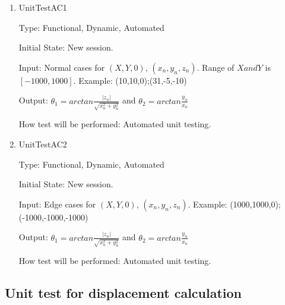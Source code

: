 \documentclass[12pt, titlepage]{article}
\begin{document}
\begin{enumerate}
	
	\item{UnitTestAC1\\}
	
	Type: Functional, Dynamic, Automated
	
	Initial State: New session.
	
	Input: Normal cases for $(X,Y,0)$, $(x_{n},y_{n},z_{n})$. Range of $X and Y$ is $[-1000,1000]$. Example: (10,10,0);(31,-5,-10)
	
	Output: $\theta_{1}=arctan \frac{|z_{n}|}{\sqrt{x_{n}^2+y_{n}^2}}$ and $\theta_{2}=arctan \frac{y_{n}}{x_{n}}$
	
	How test will be performed: Automated unit testing.
	
	\item{UnitTestAC2\\}
	
	Type: Functional, Dynamic, Automated
	
	Initial State: New session.
	
	Input: Edge cases for $(X,Y,0)$, $(x_{n},y_{n},z_{n})$. Example: (1000,1000,0);(-1000,-1000,-1000)
	
	Output: $\theta_{1}=arctan \frac{|z_{n}|}{\sqrt{x_{n}^2+y_{n}^2}}$ and $\theta_{2}=arctan \frac{y_{n}}{x_{n}}$
	
	How test will be performed: Automated unit testing.
	
\end{enumerate}

\subsection{Unit test for displacement calculation}
\end{document}
